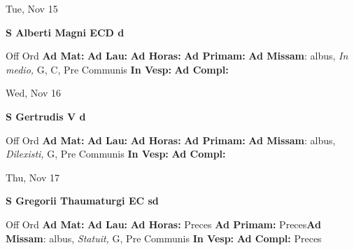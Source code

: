 \documentclass[10pt]{memoir}
\begin{document}
\begin{center}
\begin{minipage}{3.5in}
\vspace{2em}
\begin{center}Tue, Nov 15
\end{center}
\textbf{ \large S Alberti Magni ECD
\textnormal{\normalsize d}}

\begin{justify}Off Ord
\textbf{Ad Mat: }
\textbf{Ad Lau: }
\textbf{Ad Horas: }
\textbf{Ad Primam: }\textbf{Ad Missam}: albus, \textit{In medio,} G, C, Pre Communis
\textbf{In Vesp: }
\textbf{Ad Compl: }
\end{justify}
\end{minipage}
\end{center}

\begin{center}
\begin{minipage}{3.5in}
\vspace{2em}
\begin{center}Wed, Nov 16
\end{center}
\textbf{ \large S Gertrudis V
\textnormal{\normalsize d}}

\begin{justify}Off Ord
\textbf{Ad Mat: }
\textbf{Ad Lau: }
\textbf{Ad Horas: }
\textbf{Ad Primam: }\textbf{Ad Missam}: albus, \textit{Dilexisti,} G, Pre Communis
\textbf{In Vesp: }
\textbf{Ad Compl: }
\end{justify}
\end{minipage}
\end{center}

\begin{center}
\begin{minipage}{3.5in}
\vspace{2em}
\begin{center}Thu, Nov 17
\end{center}
\textbf{ \large S Gregorii Thaumaturgi EC
\textnormal{\normalsize sd}}

\begin{justify}Off Ord
\textbf{Ad Mat: }
\textbf{Ad Lau: }
\textbf{Ad Horas: }Preces
\textbf{Ad Primam: }Preces\textbf{Ad Missam}: albus, \textit{Statuit,} G, Pre Communis
\textbf{In Vesp: }
\textbf{Ad Compl: }Preces
\end{justify}
\end{minipage}
\end{center}
\end{document}
